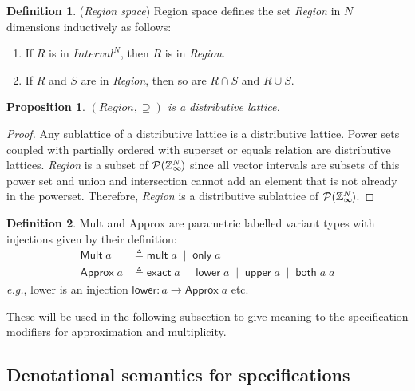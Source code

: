 \documentclass{article}
\theoremstyle{definition}
\newtheorem{defn}{Definition}
\theoremstyle{plain}
\newtheorem{prop}{Proposition}
\theoremstyle{remark}
\newcommand{\eg}{\emph{e.g.}}
\newcommand{\zinf}{\textnormal{$\mathbb{Z}_\infty$}}
\begin{document}
\begin{defn}{(\emph{Region space})}
  Region space defines the set \textit{Region} in $N$ dimensions inductively as
  follows:
%
  \begin{enumerate}
    \item If $R$ is in $\textit{Interval}^N$, then $R$ is in \textit{Region}.
    \item If $R$ and $S$ are in \textit{Region}, then so are $R \cap S$ and $R
      \cup S$.
  \end{enumerate}
\end{defn}

\begin{prop}{}
  $(\textit{Region},\supseteq)$ is a distributive lattice.
\end{prop}
%
\begin{proof}
  Any sublattice of a distributive lattice is a distributive lattice. Power sets
  coupled with partially ordered with superset or equals relation are
  distributive lattices. \textit{Region} is a subset of
  $\mathcal{P}{(\zinf{}^{\mkern-19mu{N}})}$ since all vector intervals are
  subsets of this power set and union and intersection cannot add an element
  that is not already in the powerset. Therefore, \textit{Region} is a
  distributive sublattice of $\mathcal{P}{(\zinf{}^{\mkern-19mu{N}})}$.
\end{proof}

\begin{defn}{}
  \textsf{Mult} and \textsf{Approx} are parametric labelled variant types with
  injections given by their definition:
%
  \begin{align*}
    \textsf{Mult} \; a &
      \triangleq \textsf{mult} \; a \;\mid\; \textsf{only} \; a \\
    \textsf{Approx} \; a &
      \triangleq \textsf{exact} \; a \;\mid\; \textsf{lower} \; a \;\mid\;
        \textsf{upper} \; a \;\mid\; \textsf{both} \; a \; a
  \end{align*}
%
  \eg{}, \textsf{lower} is an injection $\mathsf{lower} : a \to \mathsf{Approx}
  \; a$ etc.

  These will be used in the following subsection to give meaning to the
  specification modifiers for approximation and multiplicity.
\end{defn}

\subsection{Denotational semantics for specifications}
\end{document}
